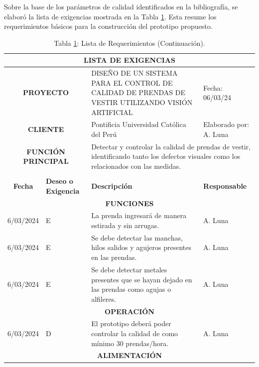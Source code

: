 Sobre la base de los parámetros de calidad identificados en la bibliografía, se elaboró la lista de exigencias mostrada en la Tabla \ref{tab:lista_exigencias}. Esta resume los requerimientos básicos para la construcción del prototipo propuesto.

\begin{longtable}{|c|p{4.5em}|p{22.5em}|p{6em}|}
	\caption{Lista de Requerimientos.}\label{tab:lista_exigencias}\\
	\hline
	\multicolumn{4}{|p{37.5em}|}{\textbf{LISTA DE EXIGENCIAS}} \bigstrut\\
	\hline
	\multicolumn{2}{|p{9em}|}{\textbf{PROYECTO}} & DISEÑO DE UN SISTEMA PARA EL CONTROL DE CALIDAD DE PRENDAS DE VESTIR UTILIZANDO VISIÓN ARTIFICIAL & Fecha: 06/03/24 \bigstrut\\
	\hline
	\multicolumn{2}{|p{9em}|}{\textbf{CLIENTE}} & Pontificia Universidad Católica del Perú & Elaborado por: A. Luna \bigstrut\\
	\hline
	\multicolumn{2}{|p{9em}|}{\parbox{4cm}{\textbf{FUNCIÓN} \\ \textbf{PRINCIPAL}}
	} & \multicolumn{2}{p{28.5em}|}{Detectar y controlar la calidad de prendas de vestir, identificando tanto los defectos visuales como los relacionados con las medidas.} \bigstrut\\
	\hline
	\endfirsthead \caption* {Tabla \ref{tab:lista_exigencias}: Lista de Requerimientos (Continuación).}\\
	\hline
	\multicolumn{1}{|p{4.5em}|}{\textbf{Fecha}} & \textbf{Deseo o Exigencia} & \textbf{Descripción} & \textbf{Responsable} \bigstrut\\
	\hline
	\endhead
	\multicolumn{4}{|p{37.5em}|}{\textbf{FUNCIONES}} \bigstrut\\
	\hline
	6/03/2024 & E     & La prenda ingresará de manera estirada y sin arrugas. & A. Luna \bigstrut\\
	\hline
	6/03/2024 & E     & Se debe detectar las manchas, hilos salidos y agujeros presentes en las prendas. & A. Luna \bigstrut\\
	\hline
	6/03/2024 & E     & Se debe detectar metales presentes que se hayan dejado en las prendas como agujas o alfileres. & A. Luna \bigstrut\\
	\hline
	\multicolumn{4}{|p{37.5em}|}{\textbf{OPERACIÓN}} \bigstrut\\
	\hline
	6/03/2024 & D     & El prototipo deberá poder controlar la calidad de como mínimo 30 prendas/hora. & A. Luna \bigstrut\\
	\hline
	\multicolumn{4}{|p{37.5em}|}{\textbf{ALIMENTACIÓN}} \bigstrut\\

\end{longtable}
